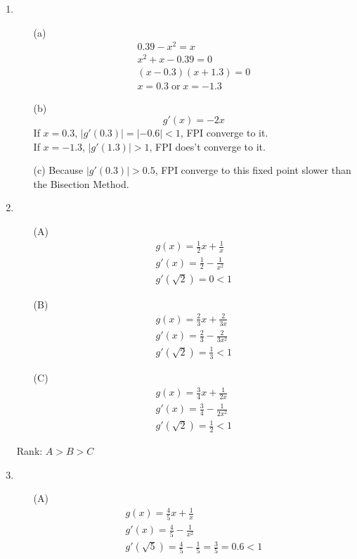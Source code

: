 \documentclass[UTF8]{ctexart}
\begin{document}
\begin{enumerate}
\begin{itemize}
\end{itemize}

\item \begin{itemize}
\item[(a)] 
\begin{gather*}
0.39 - x^2 = x \\
x^2 + x - 0.39 = 0 \\
(x - 0.3)(x + 1.3) = 0 \\
x = 0.3 \; \text{or} \; x = -1.3
\end{gather*}

\item[(b)]
\[
	g'(x) = -2x
\]
If $x = 0.3$, $|g'(0.3)| = |-0.6| < 1$, FPI converge to it. \\
If $x = -1.3$, $|g'(1.3)| > 1$, FPI does't converge to it.

\item[(c)]
Because $|g'(0.3)| > 0.5$, FPI converge to this fixed point slower than the Bisection Method.

\end{itemize}

\item \begin{itemize}
\item[(A)]
\begin{gather*}
g(x) = \frac{1}{2}x + \frac{1}{x} \\
g'(x) = \frac{1}{2} - \frac{1}{x^2} \\
g'(\sqrt{2}) = 0 < 1
\end{gather*}

\item[(B)]
\begin{gather*}
g(x) = \frac{2}{3}x + \frac{2}{3x} \\
g'(x) = \frac{2}{3} - \frac{2}{3x^2} \\
g'(\sqrt{2}) = \frac{1}{3} < 1
\end{gather*}

\item[(C)]
\begin{gather*}
g(x) = \frac{3}{4}x + \frac{1}{2x} \\
g'(x) = \frac{3}{4} - \frac{1}{2x^2} \\
g'(\sqrt{2}) = \frac{1}{2} < 1
\end{gather*}

\end{itemize}

Rank: $A > B > C$

\item \begin{itemize}
\item[(A)]
\begin{gather*}
g(x) = \frac{4}{5}x + \frac{1}{x} \\
g'(x) = \frac{4}{5} - \frac{1}{x^2} \\
g'(\sqrt{5}) = \frac{4}{5} - \frac{1}{5} = \frac{3}{5} = 0.6 < 1
\end{gather*}


\end{itemize}
\end{enumerate}
\end{document}
